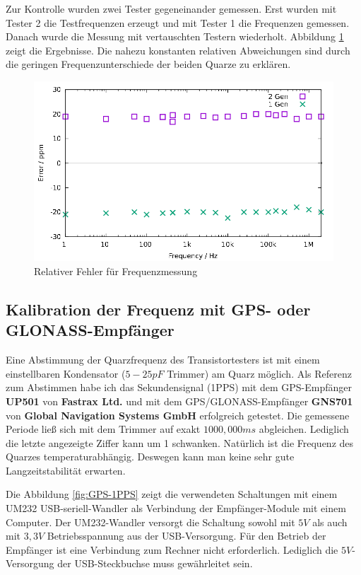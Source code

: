 Zur Kontrolle wurden zwei Tester gegeneinander gemessen.
Erst wurden mit Tester 2 die Testfrequenzen erzeugt und mit Tester 1 die Frequenzen gemessen.
Danach wurde die Messung mit vertauschten Testern wiederholt.
Abbildung \ref{fig:freq-ppm} zeigt die Ergebnisse.
Die nahezu konstanten relativen Abweichungen sind durch die geringen Frequenzunterschiede der beiden Quarze zu erklären.

\begin{figure}[H]
\centering
\includegraphics[width=18cm]{../GNU/frequency-ppm.pdf}
\caption{Relativer Fehler für Frequenzmessung }
\label{fig:freq-ppm}
\end{figure}

\subsection{Kalibration der Frequenz mit GPS- oder GLONASS-Empfänger}

Eine Abstimmung der Quarzfrequenz des Transistortesters ist mit einem einstellbaren Kondensator (\(5-25pF\) Trimmer) am Quarz möglich.
Als Referenz zum Abstimmen habe ich das Sekundensignal (1PPS) mit dem GPS-Empfänger {\bf UP501} von {\bf Fastrax Ltd.} und
mit dem GPS/GLONASS-Empfänger {\bf GNS701} von {\bf Global Navigation Systems GmbH} erfolgreich getestet.
Die gemessene Periode ließ sich mit dem Trimmer auf exakt \(1000,000ms\) abgleichen.
Lediglich die letzte angezeigte Ziffer kann um 1 schwanken.
Natürlich ist die Frequenz des Quarzes temperaturabhängig.
Deswegen kann man keine sehr gute Langzeitstabilität erwarten.

Die Abbildung \ref{fig:GPS-1PPS} zeigt die verwendeten Schaltungen mit einem
UM232 USB-seriell-Wandler als Verbindung der Empfänger-Module mit einem Computer.
Der UM232-Wandler versorgt die Schaltung sowohl mit \(5V\) als auch mit \(3,3V\) Betriebsspannung
aus der USB-Versorgung.
Für den Betrieb der Empfänger ist eine Verbindung zum Rechner nicht erforderlich.
Lediglich die \(5V\)-Versorgung der USB-Steckbuchse muss gewährleitet sein.

